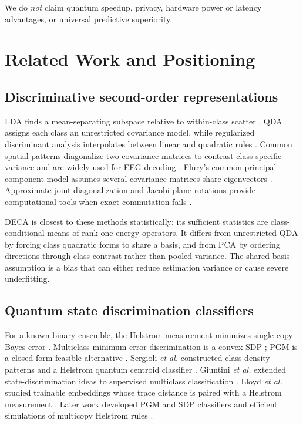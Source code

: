 \documentclass[10pt,twocolumn]{article}
\theoremstyle{definition}
\theoremstyle{remark}
\begin{document}
We do \emph{not} claim quantum speedup, privacy, hardware power or latency
advantages, or universal predictive superiority.

\section{Related Work and Positioning}
\label{sec:related}

\subsection{Discriminative second-order representations}

LDA finds a mean-separating subspace relative to within-class scatter
\cite{fisher1936}.  QDA assigns each class an unrestricted covariance model,
while regularized discriminant analysis interpolates between linear and
quadratic rules \cite{friedman1989}.  Common spatial patterns diagonalize two
covariance matrices to contrast class-specific variance and are widely used
for EEG decoding \cite{ramoser2000}.  Flury's common principal component
model assumes several covariance matrices share eigenvectors
\cite{flury1984}.  Approximate joint diagonalization and Jacobi plane
rotations provide computational tools when exact commutation fails
\cite{bunsegerstner1993,cardoso1996}.

DECA is closest to these methods statistically: its sufficient statistics are
class-conditional means of rank-one energy operators.  It differs from
unrestricted QDA by forcing class quadratic forms to share a basis, and from
PCA by ordering directions through class contrast rather than pooled
variance.  The shared-basis assumption is a bias that can either reduce
estimation variance or cause severe underfitting.

\subsection{Quantum state discrimination classifiers}

For a known binary ensemble, the Helstrom measurement minimizes single-copy
Bayes error \cite{helstrom1976}.  Multiclass minimum-error discrimination is a
convex SDP \cite{eldar2003}; PGM is a closed-form feasible alternative
\cite{hausladen1994}.  Sergioli \emph{et al.} constructed class density
patterns and a Helstrom quantum centroid classifier \cite{sergioli2019}.
Giuntini \emph{et al.} extended state-discrimination ideas to supervised
multiclass classification \cite{giuntini2021}.  Lloyd \emph{et al.} studied
trainable embeddings whose trace distance is paired with a Helstrom
measurement \cite{lloyd2020}.  Later work developed PGM and SDP
classifiers \cite{cruzeiro2023} and efficient simulations of multicopy
Helstrom rules \cite{hwang2024}.
\end{document}
